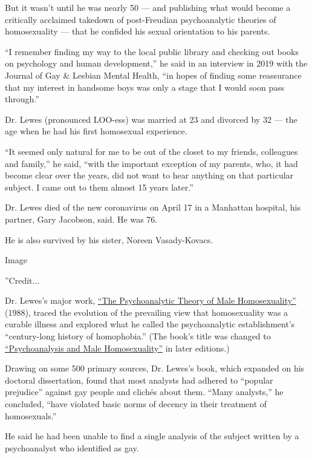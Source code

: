 But it wasn't until he was nearly 50 --- and publishing what would
become a critically acclaimed takedown of post-Freudian psychoanalytic
theories of homosexuality --- that he confided his sexual orientation to
his parents.

``I remember finding my way to the local public library and checking out
books on psychology and human development,'' he said in an interview in
2019 with the Journal of Gay \& Lesbian Mental Health, ``in hopes of
finding some reassurance that my interest in handsome boys was only a
stage that I would soon pass through.''

Dr. Lewes (pronounced LOO-ess) was married at 23 and divorced by 32 ---
the age when he had his first homosexual experience.

``It seemed only natural for me to be out of the closet to my friends,
colleagues and family,'' he said, ``with the important exception of my
parents, who, it had become clear over the years, did not want to hear
anything on that particular subject. I came out to them almost 15 years
later.''

Dr. Lewes died of the new coronavirus on April 17 in a Manhattan
hospital, his partner, Gary Jacobson, said. He was 76.

He is also survived by his sister, Noreen Vasady-Kovacs.

Image

''Credit...

Dr. Lewes's major work,
\href{https://www.nytimes.com/1988/12/11/books/navigating-the-straits-of-oedipus.html}{``The
Psychoanalytic Theory of Male Homosexuality''} (1988), traced the
evolution of the prevailing view that homosexuality was a curable
illness and explored what he called the psychoanalytic establishment's
``century-long history of homophobia.'' (The book's title was changed to
\href{https://catalog.loc.gov/vwebv/search?searchCode=LCCN\&searchArg=2008944236\&searchType=1\&permalink=y}{``Psychoanalysis
and Male Homosexuality''} in later editions.)

Drawing on some 500 primary sources, Dr. Lewes's book, which expanded on
his doctoral dissertation, found that most analysts had adhered to
``popular prejudice'' against gay people and clichés about them. ``Many
analysts,'' he concluded, ``have violated basic norms of decency in
their treatment of homosexuals.''

He said he had been unable to find a single analysis of the subject
written by a psychoanalyst who identified as gay.

